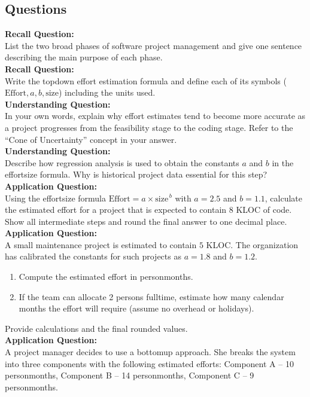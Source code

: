 \documentclass[12pt, a4paper]{article}
\begin{document}
\subsection*{Questions}
\textbf{Recall Question:}\\
List the two broad phases of software project management and give one sentence describing the main purpose of each phase.\\
\newpage
\textbf{Recall Question:}\\
Write the topdown effort estimation formula and define each of its symbols (\(\mbox{Effort}, a, b, \mbox{size}\)) including the units used.\\
\newpage
\textbf{Understanding Question:}\\
In your own words, explain why effort estimates tend to become more accurate as a project progresses from the feasibility stage to the coding stage. Refer to the ``Cone of Uncertainty'' concept in your answer.\\
\newpage
\textbf{Understanding Question:}\\
Describe how regression analysis is used to obtain the constants \(a\) and \(b\) in the effortsize formula. Why is historical project data essential for this step?\\
\newpage
\textbf{Application Question:}\\
Using the effortsize formula \(\mbox{Effort}=a \times \mbox{size}^{\,b}\) with \(a = 2.5\) and \(b = 1.1\), calculate the estimated effort for a project that is expected to contain \(8\) KLOC of code. Show all intermediate steps and round the final answer to one decimal place.\\
\newpage
\textbf{Application Question:}\\
A small maintenance project is estimated to contain \(5\) KLOC. The organization has calibrated the constants for such projects as \(a = 1.8\) and \(b = 1.2\).  
\begin{enumerate}
  \item Compute the estimated effort in personmonths.
  \item If the team can allocate 2 persons fulltime, estimate how many calendar months the effort will require (assume no overhead or holidays).
\end{enumerate}  
Provide calculations and the final rounded values.\\
\newpage
\textbf{Application Question:}\\
A project manager decides to use a bottomup approach. She breaks the system into three components with the following estimated efforts: Component A -- 10 personmonths, Component B -- 14 personmonths, Component C -- 9 personmonths.  
\end{document}

